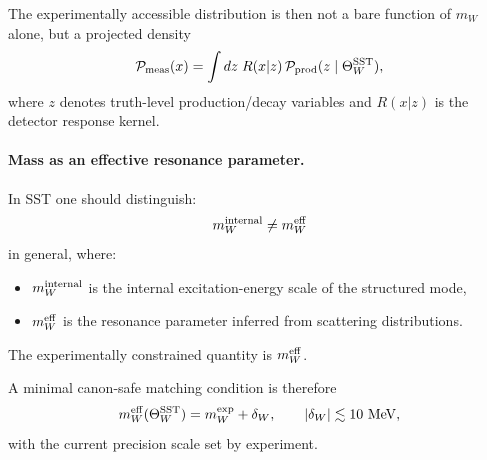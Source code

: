 \documentclass[11pt]{article}
\theoremstyle{definition}
\theoremstyle{plain}
\theoremstyle{remark}
\begin{document}
            The experimentally accessible distribution is then not a bare function of $m_W$ alone, but a projected density
            \begin{equation}
                \mathcal{P}_{\rm meas}(x)
                =
                \int dz\; R(x|z)\,\mathcal{P}_{\rm prod}(z\mid \Theta_W^{\rm SST}),
                \label{eq:sst-forward-map}
            \end{equation}
            where $z$ denotes truth-level production/decay variables and $R(x|z)$ is the detector response kernel.
    
        \paragraph{Mass as an effective resonance parameter.}
            In SST one should distinguish:
            \begin{equation}
                m_W^{\rm internal}
                \neq
                m_W^{\rm eff}
            \end{equation}
            in general, where:
            \begin{itemize}
                \item $m_W^{\rm internal}$ is the internal excitation-energy scale of the structured mode,
                \item $m_W^{\rm eff}$ is the resonance parameter inferred from scattering distributions.
            \end{itemize}
            The experimentally constrained quantity is $m_W^{\rm eff}$.
            
            A minimal canon-safe matching condition is therefore
            \begin{equation}
                m_W^{\rm eff}(\Theta_W^{\rm SST}) = m_W^{\rm exp} + \delta_W,
                \qquad
                |\delta_W| \lesssim 10~{\rm MeV},
                \label{eq:mw-match}
            \end{equation}
            with the current precision scale set by experiment.
    
\end{document}
